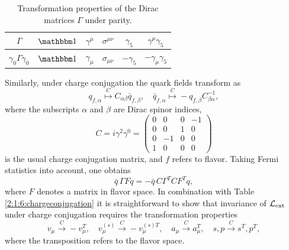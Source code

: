 \documentclass[twoside,12pt]{article}
\begin{document}
\begin{table}[t]
\begin{center}
\renewcommand{\arraystretch}{1.5}
\begin{tabular}{|c|c|c|c|c|c|}
\hline $\Gamma$& $\mathbbm 1$& $\gamma^\mu$& $\sigma^{\mu\nu}$& $\gamma_5$&
$\gamma^\mu\gamma_5$\\
\hline $\gamma_0 \Gamma \gamma_0$& $\mathbbm 1$& $\gamma_\mu$&
$\sigma_{\mu\nu}$& $-\gamma_5$& $-\gamma_\mu\gamma_5$
\\
\hline
\end{tabular}
\end{center}
\caption{\label{2:1:6:parity} Transformation properties of the Dirac
matrices $\Gamma$ under parity.}
\end{table}

   Similarly, under charge conjugation the quark fields transform as
\begin{equation}
\label{2:1:6:qtrafc}
q_{f,\alpha}\stackrel{\mbox{$C$}}{\mapsto}C_{\alpha\beta}\bar{q}_{f,\beta},
\quad
\bar{q}_{f,\alpha}\stackrel{\mbox{$C$}}{\mapsto}
-q_{f,\beta}C^{-1}_{\beta\alpha},
\end{equation}
   where the subscripts $\alpha$ and $\beta$ are Dirac
spinor indices,
\begin{displaymath}
C=i\gamma^2\gamma^0
=\left(\begin{array}{cccc}0&0&0&-1\\0&0&1&0\\
0&-1&0&0\\
1&0&0&0
\end{array}\right)
\end{displaymath}
is the usual charge conjugation matrix, and $f$ refers to flavor.
   Taking Fermi statistics into account, one obtains
\begin{displaymath}
\bar{q}\,\Gamma F q=-\bar{q}\, C \Gamma^T C F^T q,
\end{displaymath}
where $F$ denotes a matrix in flavor space.
   In combination with Table
\ref{2:1:6:chargeconjugation} it is straightforward to show that invariance
of ${\cal L}_{\rm ext}$ under charge conjugation requires the transformation
properties
\begin{equation}
\label{2:1:6:eftrafoc}
v_\mu\stackrel{C}{\rightarrow}-v_\mu^T,\quad
v_\mu^{(s)}\stackrel{C}{\rightarrow}-v_\mu^{(s)T},\quad
a_\mu\stackrel{C}{\rightarrow}a_\mu^T,\quad
s,p\stackrel{C}{\rightarrow}s^T,p^T,
\end{equation}
where the transposition refers to the flavor space.
\end{document}

